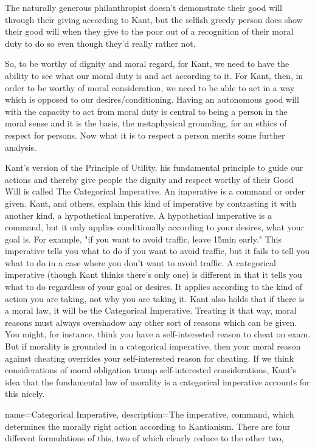 The naturally generous philanthropist doesn’t demonstrate their good will through their giving according to Kant, but the selfish greedy person does show their good will when they give to the poor out of a recognition of their moral duty to do so even though they’d really rather not.

So, to be worthy of dignity and moral regard, for Kant, we need to have the ability to see what our moral duty is and act according to it. For Kant, then, in order to be worthy of moral consideration, we need to be able to act in a way which is opposed to our desires/conditioning. Having an autonomous good will with the capacity to act from moral duty is central to being a person in the moral sense and it is the basis, the metaphysical grounding, for an ethics of respect for persons. Now what it is to respect a person merits some further analysis.

Kant's version of the Principle of Utility, his fundamental principle to guide our actions and thereby give people the dignity and respect worthy of their Good Will is called The \gls{Categorical Imperative}. An imperative is a command or order given. Kant, and others, explain this kind of imperative by contrasting it with another kind, a hypothetical imperative. A hypothetical imperative is a command, but it only applies conditionally according to your desires, what your goal is. For example, "if you want to avoid traffic, leave 15min early." This imperative tells you what to do if you want to avoid traffic, but it fails to tell you what to do in a case where you don't want to avoid traffic. A categorical imperative (though Kant thinks there's only one) is different in that it tells you what to do regardless of your goal or desires. It applies according to the kind of action you are taking, not why you are taking it. Kant also holds that if there is a moral law, it will be the Categorical Imperative. Treating it that way, moral reasons must always overshadow any other sort of reasons which can be given. You might, for instance, think you have a self-interested reason to cheat on exam. But if morality is grounded in a categorical imperative, then your moral reason against cheating overrides your self-interested reason for cheating. If we think considerations of moral obligation trump self-interested considerations, Kant’s idea that the fundamental law of morality is a categorical imperative accounts for this nicely.

{
  name=Categorical Imperative,
  description={The imperative, command, which determines the morally right action according to Kantianism. There are four different formulations of this, two of which clearly reduce to the other two},
}



